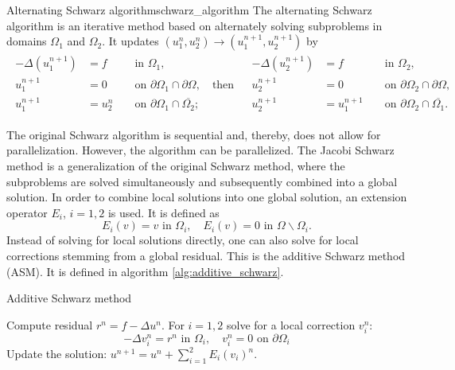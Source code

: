 \begin{fancydef}{Alternating Schwarz algorithm}{schwarz_algorithm}
    The alternating Schwarz algorithm is an iterative method based on alternately solving subproblems in domains $\Omega_1$ and $\Omega_2$. It updates $\left(u_1^n, u_2^n\right) \rightarrow\left(u_1^{n+1}, u_2^{n+1}\right)$ by
    \[
        \begin{array}{cc}
            \begin{aligned}
                -\Delta\left(u_1^{n+1}\right) & =f     &  & \text { in } \Omega_1,                                                 \\
                u_1^{n+1}                     & =0     &  & \text { on } \partial \Omega_1 \cap \partial \Omega, \quad \text{then} \\
                u_1^{n+1}                     & =u_2^n &  & \text { on } \partial \Omega_1 \cap \overline{\Omega_2} ;
            \end{aligned} &
            \begin{aligned}
                -\Delta\left(u_2^{n+1}\right) & =f         &  & \text { in } \Omega_2,                                   \\
                u_2^{n+1}                     & =0         &  & \text { on } \partial \Omega_2 \cap \partial \Omega,     \\
                u_2^{n+1}                     & =u_1^{n+1} &  & \text { on } \partial \Omega_2 \cap \overline{\Omega_1}.
            \end{aligned}
        \end{array}
    \]
    \label{def:schwarz_algorithm}
\end{fancydef}

The original Schwarz algorithm is sequential and, thereby, does not allow for parallelization. However, the algorithm can be parallelized. The Jacobi Schwarz method is a generalization of the original Schwarz method, where the subproblems are solved simultaneously and subsequently combined into a global solution\cite{og_alternating_schwarz_Lions1990}. In order to combine local solutions into one global solution, an extension operator $E_i$, $i=1,2$ is used. It is defined as
\[
    E_i(v)=v \text { in } \Omega_i, \quad E_i(v)=0 \text { in } \Omega \backslash \Omega_i.
\]
Instead of solving for local solutions directly, one can also solve for local corrections stemming from a global residual. This is the additive Schwarz method (ASM). It is defined in algorithm \ref{alg:additive_schwarz}.
\begin{algorithm}[H]
    \caption{Additive Schwarz method \cite[Algorithm 1.2]{schwarz_methods_Dolean_2015}}
    \label{alg:additive_schwarz}
    \begin{algorithmic}
        \State Compute residual $r^n=f-\Delta u^n$.
        \State For $i=1,2$ solve for a local correction $v_i^n$:
        \[
            -\Delta v_i^n=r^n \text{ in } \Omega_i, \quad v_i^n=0 \text{ on } \partial \Omega_i
        \]
        \State Update the solution: $u^{n+1}=u^n+\sum_{i=1}^{2}E_i(v_i)^n$.
    \end{algorithmic}
\end{algorithm}

